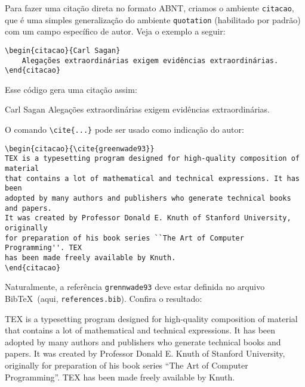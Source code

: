 Para fazer uma citação direta no formato ABNT, criamos o ambiente \verb|citacao|, que é uma simples generalização do ambiente \verb|quotation| (habilitado por padrão) com um campo específico de autor. Veja o exemplo a seguir:
\begin{verbatim}
\begin{citacao}{Carl Sagan}
    Alegações extraordinárias exigem evidências extraordinárias.
\end{citacao}
\end{verbatim}
Esse código gera uma citação assim:
\begin{citacao}{Carl Sagan}
    Alegações extraordinárias exigem evidências extraordinárias.
\end{citacao}
O comando \verb|\cite{...}| pode ser usado como indicação do autor:
\begin{verbatim}
\begin{citacao}{\cite{greenwade93}}
TEX is a typesetting program designed for high-quality composition of material
that contains a lot of mathematical and technical expressions. It has been 
adopted by many authors and publishers who generate technical books and papers. 
It was created by Professor Donald E. Knuth of Stanford University, originally 
for preparation of his book series ``The Art of Computer Programming''. TEX 
has been made freely available by Knuth.
\end{citacao}
\end{verbatim}
Naturalmente, a referência \verb|grennwade93| deve estar definida no arquivo Bib\TeX\ (aqui, \verb|references.bib|). Confira o resultado:
\begin{citacao}{\cite{greenwade93}}
TEX is a typesetting program designed for high-quality composition of material that contains a lot of mathematical and technical expressions. It has been adopted by many authors and publishers who generate technical books and papers. It was created by Professor Donald E. Knuth of Stanford University, originally for preparation of his book series ``The Art of Computer Programming''. TEX has been made freely available by Knuth.
\end{citacao}